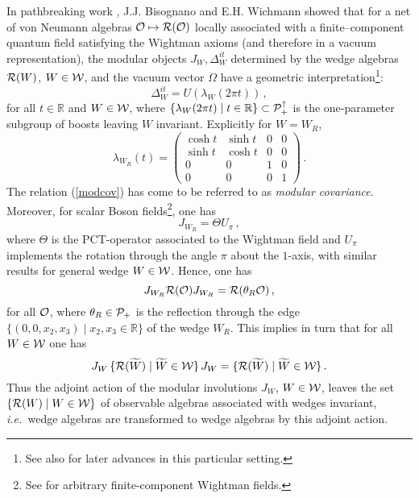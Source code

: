 \documentclass[12pt]{article}
\newcommand{\ie}{{\it i.e.\ }}
\def\Os{{\cal O}}
\def\Ps{{\cal P}}
\def\Rs{{\cal R}}
\def\Ws{{\cal W}}
\def\Pid{{\Ps_+ ^{\uparrow}}}
\def\RR{{\mathbb R}}
\begin{document}
     In pathbreaking work \cite{BW1,BW2}, J.J. Bisognano and
E.H. Wichmann showed that for a net of von Neumann algebras 
$\Os \mapsto \Rs(\Os)$ locally associated with a finite--component 
quantum field satisfying the Wightman axioms \cite{Jo,StWi,BLT} 
(and therefore in a vacuum representation), the modular objects 
$J_W, \Delta_W^{it}$ determined by the wedge algebras 
$\Rs(W)$, $W \in \Ws$, and the vacuum vector $\Omega$ have a geometric 
interpretation\footnote{See also \cite{DrSuWi} for later advances in 
this particular setting.}:
% 
\begin{equation} \label{modcov}
\Delta_W^{it} = U(\lambda_W(2\pi t)) \, , 
\end{equation}
%
for all $t \in \RR$ and $W \in \Ws$, where 
$\{\lambda_W(2\pi t) \mid t \in\RR\} \subset \Pid$ is the one-parameter 
subgroup of boosts leaving $W$ invariant. Explicitly for $W = W_R$,
%
$$ \lambda_{W_R}(t) =  
              \left( \begin{array}{cccc} \cosh t & \sinh t & 0 & 0 \\ 
                     \sinh t & \cosh t & 0 & 0 \\
                     0 & 0 & 1 & 0 \\
                     0 & 0 & 0 & 1  \end{array} \right)   \, .  $$
%
The relation (\ref{modcov}) has come to be referred to as {\it modular
covariance}. Moreover, for scalar Boson fields\footnote{See \cite{BW2} 
for arbitrary finite-component Wightman fields.}, one has
%
\begin{equation} \label{Jtheta}
J_{W_R} = \Theta U_{\pi} \, ,
\end{equation}
%
where $\Theta$ is the PCT-operator associated to the Wightman field
and $U_{\pi}$ implements the rotation through the angle $\pi$ about 
the $1$-axis, with similar results for general wedge $W \in \Ws$.
Hence, one has
%
\begin{equation} \label{Jcgma}
J_{W_R} \Rs(\Os) J_{W_R} = \Rs(\theta_R \Os) \, ,
\end{equation}
%
for all $\Os$, where $\theta_R \in \Ps_+$ is the reflection through 
the edge 
$\{ (0,0,x_2,x_3) \mid x_2,x_3 \in \RR \}$ of the wedge $W_R$. This
implies in turn that for all $W \in \Ws$ one has
%
\begin{equation} \label{BWcgma}
J_{W} \, \{ \Rs(\widetilde{W}) \mid \widetilde{W} \in \Ws \} \, J_{W} = 
\{ \Rs(\widetilde{W}) \mid \widetilde{W} \in \Ws \} \, .
\end{equation}
%
Thus the adjoint action of the modular involutions $J_W$, $W \in \Ws$, 
leaves the set 
$\{ \Rs(W) \mid W \in \Ws \}$ of observable algebras associated
with wedges invariant, \ie wedge algebras are transformed to wedge
algebras by this adjoint action.
\end{document}
